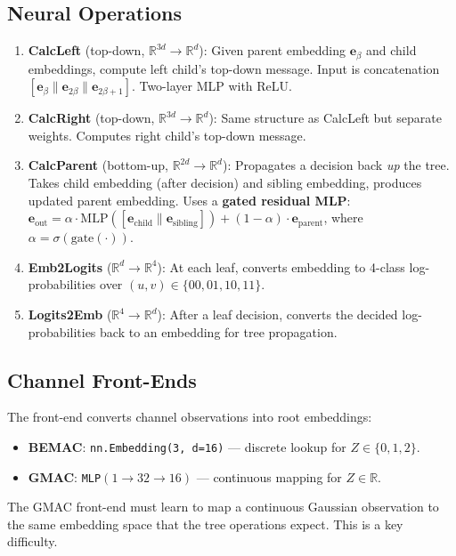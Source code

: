 \documentclass[10pt]{article}
\begin{document}
\subsection{Neural Operations}

\begin{enumerate}[nosep]
    \item \textbf{CalcLeft} (top-down, $\mathbb{R}^{3d} \to \mathbb{R}^d$): Given parent embedding $\mathbf{e}_\beta$ and child embeddings, compute left child's top-down message. Input is concatenation $[\mathbf{e}_\beta \| \mathbf{e}_{2\beta} \| \mathbf{e}_{2\beta+1}]$. Two-layer MLP with ReLU.

    \item \textbf{CalcRight} (top-down, $\mathbb{R}^{3d} \to \mathbb{R}^d$): Same structure as CalcLeft but separate weights. Computes right child's top-down message.

    \item \textbf{CalcParent} (bottom-up, $\mathbb{R}^{2d} \to \mathbb{R}^d$): Propagates a decision back \emph{up} the tree. Takes child embedding (after decision) and sibling embedding, produces updated parent embedding. Uses a \textbf{gated residual MLP}: $\mathbf{e}_\text{out} = \alpha \cdot \text{MLP}([\mathbf{e}_\text{child} \| \mathbf{e}_\text{sibling}]) + (1 - \alpha) \cdot \mathbf{e}_\text{parent}$, where $\alpha = \sigma(\text{gate}(\cdot))$.

    \item \textbf{Emb2Logits} ($\mathbb{R}^d \to \mathbb{R}^4$): At each leaf, converts embedding to 4-class log-probabilities over $(u, v) \in \{00, 01, 10, 11\}$.

    \item \textbf{Logits2Emb} ($\mathbb{R}^4 \to \mathbb{R}^d$): After a leaf decision, converts the decided log-probabilities back to an embedding for tree propagation.
\end{enumerate}

\subsection{Channel Front-Ends}

The front-end converts channel observations into root embeddings:
\begin{itemize}[nosep]
    \item \textbf{BEMAC}: \texttt{nn.Embedding(3, d=16)} --- discrete lookup for $Z \in \{0, 1, 2\}$.
    \item \textbf{GMAC}: \texttt{MLP}$(1 \to 32 \to 16)$ --- continuous mapping for $Z \in \mathbb{R}$.
\end{itemize}
The GMAC front-end must learn to map a continuous Gaussian observation to the same embedding space that the tree operations expect. This is a key difficulty.
\end{document}
